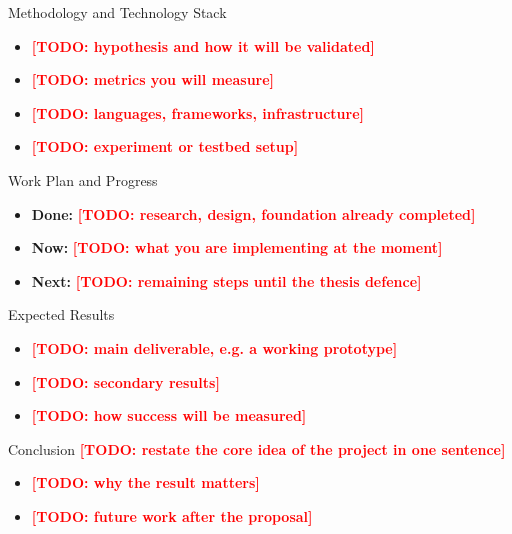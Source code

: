 \documentclass[aspectratio=169, 14pt]{beamer}
\newcommand{\todo}[1]{\textcolor{red}{\textbf{[TODO: #1]}}}
\begin{document}
\begin{frame}{Methodology and Technology Stack}
  \begin{itemize}
    \item \todo{hypothesis and how it will be validated}
    \item \todo{metrics you will measure}
    \item \todo{languages, frameworks, infrastructure}
    \item \todo{experiment or testbed setup}
  \end{itemize}
\end{frame}

\begin{frame}{Work Plan and Progress}
  \begin{itemize}
    \item \textbf{Done:} \todo{research, design, foundation already completed}
    \item \textbf{Now:} \todo{what you are implementing at the moment}
    \item \textbf{Next:} \todo{remaining steps until the thesis defence}
  \end{itemize}
\end{frame}

\begin{frame}{Expected Results}
  \begin{itemize}
    \item \todo{main deliverable, e.g. a working prototype}
    \item \todo{secondary results}
    \item \todo{how success will be measured}
  \end{itemize}
\end{frame}

\begin{frame}{Conclusion}
  \todo{restate the core idea of the project in one sentence}

  \vspace{0.4em}
  \begin{itemize}
    \item \todo{why the result matters}
    \item \todo{future work after the proposal}
  \end{itemize}
\end{frame}
\end{document}
